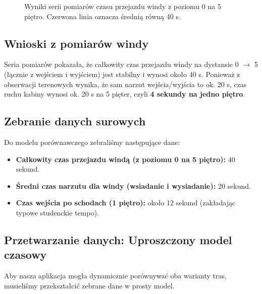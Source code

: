 \documentclass{article}
\begin{document}
\begin{figure}[htpb]
    \centering
    \caption{Wyniki serii pomiarów czasu przejazdu windy z poziomu 0 na 5 piętro. Czerwona linia oznacza średnią równą 40 s.}
    \label{fig:pomiary-windy-0-5}
\end{figure}

\subsection{Wnioski z pomiarów windy}
Seria pomiarów pokazała, że całkowity czas przejazdu windy na dystansie 0 $\rightarrow$ 5 (łącznie z wejściem i wyjściem) jest stabilny i wynosi około 40 s. Ponieważ z obserwacji terenowych wynika, że sam narzut wejścia/wyjścia to ok. 20 s, czas ruchu kabiny wynosi ok. 20 s na 5 pięter, czyli \textbf{4 sekundy na jedno piętro}.

\subsection{Zebranie danych surowych}
Do modelu porównawczego zebraliśmy następujące dane:
\begin{itemize}
    \item \textbf{Całkowity czas przejazdu windą (z poziomu 0 na 5 piętro):} 40 sekund.
    \item \textbf{Średni czas narzutu dla windy (wsiadanie i wysiadanie):} 20 sekund.
    \item \textbf{Czas wejścia po schodach (1 piętro):} około 12 sekund (zakładając typowe studenckie tempo).
\end{itemize}

\subsection{Przetwarzanie danych: Uproszczony model czasowy}
Aby nasza aplikacja mogła dynamicznie porównywać oba warianty tras, musieliśmy przekształcić zebrane dane w prosty model. 
\end{document}
